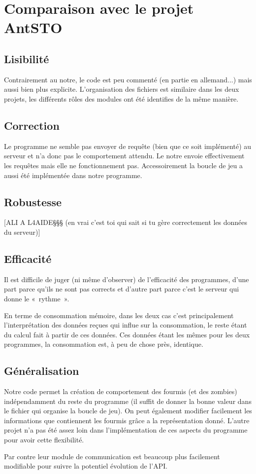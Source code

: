 \documentclass[12pt,a4paper]{report}
\begin{document}
\chapter{Comparaison avec le projet AntSTO}

\section{Lisibilité}

Contrairement au notre, le code est peu commenté (en partie en allemand...) mais aussi bien plus explicite.
L'organisation des fichiers est similaire dans les deux projets, les différents rôles des modules ont été identifies de la même manière.

\section{Correction}

Le programme ne semble pas envoyer de requête (bien que ce soit implémenté) au serveur et n'a donc pas le comportement attendu. 
Le notre envoie effectivement les requêtes mais elle ne fonctionnement pas. Accessoirement la boucle de jeu a aussi été implémentée dans notre programme.

\section{Robustesse}

[ALI A L4AIDE§§§ (en vrai c'est toi qui sait si tu gère correctement les données du serveur)]

\section{Efficacité}

Il est difficile de juger (ni même d'observer) de l'efficacité des programmes, d'une part parce qu'ils ne sont pas corrects et d'autre part parce c'est le serveur qui donne le « rythme ».

En terme de consommation mémoire, dans les deux cas c'est principalement l'interprétation des données reçues qui influe sur la consommation, le reste étant du calcul fait à partir de ces données.
Ces données étant les mêmes pour les deux programmes, la consommation est, à peu de chose près, identique. 

\section{Généralisation}

Notre code permet la création de comportement des fourmis (et des zombies) indépendamment du reste du programme (il suffit de donner la bonne valeur dans le fichier qui organise la boucle de jeu). On peut également modifier facilement les informations que contiennent les fourmis grâce a la représentation donné.
L'autre projet n'a pas été assez loin dans l'implémentation de ces aspects du programme pour avoir cette flexibilité.

Par contre leur module de communication est beaucoup plus facilement modifiable pour suivre la potentiel évolution de l'API.
\end{document}
